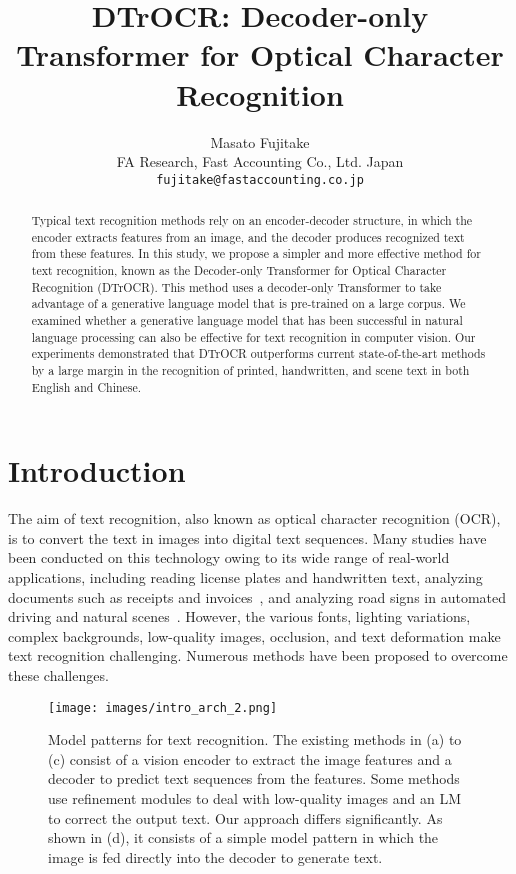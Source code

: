 \documentclass[10pt,twocolumn,letterpaper]{article}
\begin{document}
\title{DTrOCR: Decoder-only Transformer for Optical Character Recognition}

\author{Masato Fujitake\\
FA Research, 
Fast Accounting Co., Ltd.
Japan \\
{\tt\small fujitake@fastaccounting.co.jp}
}
\maketitle

\begin{abstract}
    Typical text recognition methods rely on an encoder-decoder structure, in which the encoder extracts features from an image, and the decoder produces recognized text from these features. 
In this study, we propose a simpler and more effective method for text recognition, known as the Decoder-only Transformer for Optical Character Recognition (DTrOCR).
This method uses a decoder-only Transformer to take advantage of a generative language model that is pre-trained on a large corpus.
We examined whether a generative language model that has been successful in natural language processing can also be effective for text recognition in computer vision.  
Our experiments demonstrated that DTrOCR outperforms current state-of-the-art methods by a large margin in the recognition of printed, handwritten, and scene text in both English and Chinese. \end{abstract}



\section{Introduction} \label{intro}
The aim of text recognition, also known as optical character recognition (OCR), is to convert the text in images into digital text sequences.
Many studies have been conducted on this technology owing to its wide range of real-world applications, including reading license plates and handwritten text, analyzing documents such as receipts and invoices~\cite{huang2019sroie, yiheng2020layoutlm}, and analyzing road signs in automated driving and natural scenes~\cite{fujitake2021tcbam, fujitake2023a3s}.
However, the various fonts, lighting variations, complex backgrounds, low-quality images, occlusion, and text deformation make text recognition challenging.
Numerous methods have been proposed to overcome these challenges.
 

\begin{figure}[htp]
	\centering
	\texttt{[image: images/intro\_arch\_2.png]}
	\caption{
Model patterns for text recognition.
The existing methods in (a) to (c) consist of a vision encoder to extract the image features and a decoder to predict text sequences from the features.
Some methods use refinement modules to deal with low-quality images and an LM to correct the output text.
Our approach differs significantly.
As shown in (d), it consists of a simple model pattern in which the image is fed directly into the decoder to generate text.
 }
	\label{fig:several_arch}
\end{figure}
\end{document}

